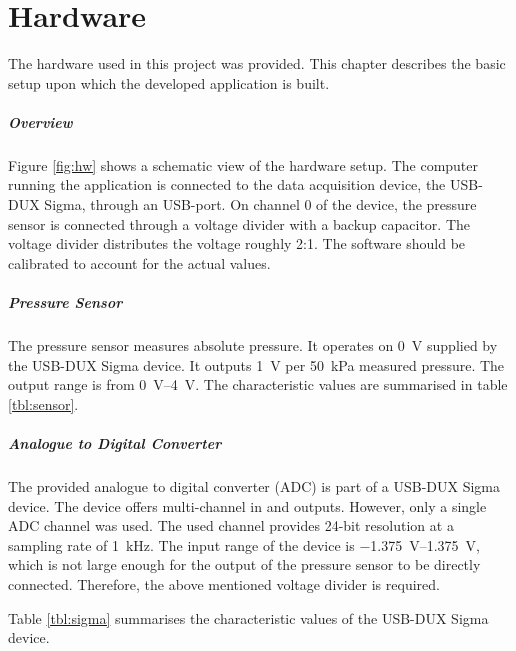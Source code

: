 \chapter{Hardware}\label{cp:hw}
The hardware used in this project was provided. This chapter describes the basic setup upon which the developed application is built. 

\paragraph{Overview}\mbox{}\newline
Figure \ref{fig:hw} shows a schematic view of the hardware setup. The computer running the application is connected to the data acquisition device, the USB-DUX Sigma, through an USB-port. On channel 0 of the device, the pressure sensor is connected through a voltage divider with a backup capacitor. The voltage divider distributes the voltage roughly 2:1. The software should be calibrated to account for the actual values.

\paragraph{Pressure Sensor}\mbox{}\newline
The pressure sensor measures absolute pressure. It operates on \SI{0}{\volt} supplied by the USB-DUX Sigma device. It outputs \SI{1}{\volt} per \SI{50}{\kilo\pascal} measured pressure. The output range is from \SIrange{0}{4}{\volt}. The characteristic values are summarised in table \ref{tbl:sensor}.


\paragraph{Analogue to Digital Converter}\mbox{}\newline
The provided analogue to digital converter (ADC) is part of a USB-DUX Sigma device. The device offers multi-channel in and outputs. However, only a single ADC channel was used. 
The used channel provides 24-bit resolution at a sampling rate of \SI{1}{\kilo\hertz}. The input range of the device is \SIrange{-1.375}{1.375}{\volt}, which is not large enough for the output of the pressure sensor to be directly connected. Therefore, the above mentioned voltage divider is required.

Table \ref{tbl:sigma} summarises the characteristic values of the USB-DUX Sigma device. 
